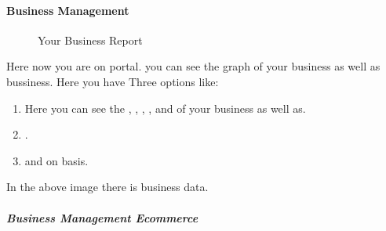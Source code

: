 \documentclass[a4paper,10pt,english]{report}
\begin{document}
\paragraph{Business Management}
\label{\detokenize{businessmgmt:business-management}}\label{\detokenize{businessmgmt::doc}}
\begin{figure}[htbp]
\centering

\noindent{}
\end{figure}

\begin{figure}[htbp]
\centering
\capstart

\noindent{}
\caption{Your Business Report}\label{\detokenize{businessmgmt:id2}}\label{\detokenize{businessmgmt:id1}}\end{figure}

Here now you are on  portal. you can see the graph of your  business as well as  bussiness.
Here you have Three options like:
\begin{enumerate}
\def\theenumi{\arabic{enumi}}
\def\labelenumi{\theenumi .}
\makeatletter\def\p@enumii{\p@enumi \theenumi .}\makeatother
\item {} 
Here you can see the , , , ,  and  of your business  as well as.

\item {} 
.

\item {} 
and on  basis.

\end{enumerate}

\begin{figure}[htbp]
\centering

\noindent{}
\end{figure}

In the above image there is  business data.


\subparagraph{Business Management Ecommerce}
\label{\detokenize{BMecomm:business-management-ecommerce}}\label{\detokenize{BMecomm::doc}}
\begin{figure}[htbp]
\centering

\noindent{}
\end{figure}
\end{document}
